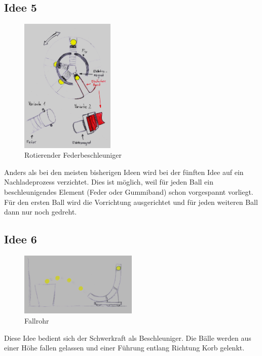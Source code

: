\subsection{Idee 5}
\begin{figure}[h!]
	\centering
	\includegraphics[width=0.4\textwidth]{../../fig/Feder_Gummirad.jpg}
	\caption{Rotierender Federbeschleuniger}
	\label{fig:feder_gummirad}
\end{figure}
Anders als bei den meisten bisherigen Ideen wird bei der fünften Idee auf ein Nachladeprozess verzichtet. Dies ist möglich, weil für jeden Ball ein beschleunigendes Element (Feder oder Gummiband) schon vorgespannt vorliegt. Für den ersten Ball wird die Vorrichtung ausgerichtet und für jeden weiteren Ball dann nur noch gedreht.

\subsection{Idee 6}
\begin{figure}[h!]
	\centering
	\includegraphics[width=0.5\textwidth]{../../fig/Fallrohr.jpg}
	\caption{Fallrohr}
	\label{fig:fallrohr}
\end{figure}
Diese Idee bedient sich der Schwerkraft als Beschleuniger. Die Bälle werden aus einer Höhe fallen gelassen und einer Führung entlang Richtung Korb gelenkt.

